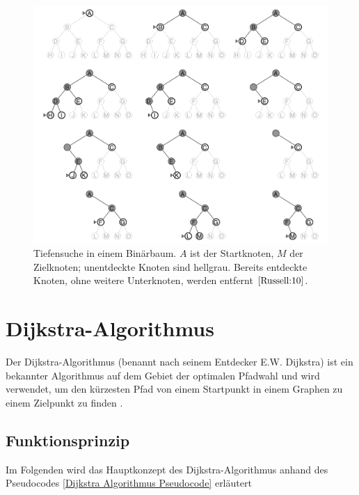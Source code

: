 \begin{figure}[H]
	\centering
	\includegraphics[width=1.0\textwidth]{images/tiefensuche.png}
	\caption{Tiefensuche in einem Binärbaum. $A$ ist der Startknoten, $M$ der Zielknoten; unentdeckte Knoten sind hellgrau. 
		Bereits entdeckte Knoten, ohne weitere Unterknoten, werden entfernt $\cite[86]{Russell:10}$.}
	\label{fig:Tiefensuche}
\end{figure}

\section{Dijkstra-Algorithmus}
\label{Dijkstra-Algorithmus}

Der Dijkstra-Algorithmus (benannt nach seinem Entdecker E.W. Dijkstra) ist ein bekannter Algorithmus auf dem Gebiet der optimalen
Pfadwahl und wird verwendet, um den kürzesten Pfad von einem Startpunkt in einem Graphen zu einem Zielpunkt zu finden \cite{Javaid2019}.

\subsection{Funktionsprinzip}

Im Folgenden wird das Hauptkonzept des Dijkstra-Algorithmus anhand des Pseudocodes \ref{Dijkstra Algorithmus Pseudocode} erläutert

